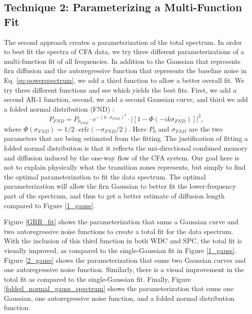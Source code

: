 \documentclass[draft, jgrga]{AGUTeX}
\begin{document}
\begin{article}
\subsection{Technique 2: Parameterizing a Multi-Function Fit}
The second approach creates a parameterization of the total spectrum. In order to best fit the spectra of CFA data, we try three different parameterizations of a multi-function fit of all frequencies. In addition to the Gaussian that represents firn diffusion and the autoregressive function that represents the baseline noise in Eq. \ref{eq:powerspectrum}, we add a third function to allow a better overall fit. We try three different functions and see which yields the best fits. First, we add a second AR-1 function, second, we add a second Gaussian curve, and third we add a folded normal distribution (FND) \citep{Tsagris2014}:
\begin{equation}
P_{FND} = P_{0_{FND}} \cdot e^{-(k \cdot \sigma_{FND})^2} \cdot |\left[1 - \Phi(-i k \sigma_{FND})\right]|^2,
\end{equation}
where $\Phi(\sigma_{FND}) = 1/2\cdot \mathrm{erfc}(-\sigma_{FND}/2) $. Here $P_0$ and $\sigma_{FND}$ are the two parameters that are being estimated from the fitting. The justification of fitting a folded normal distribution is that it reflects the uni-directional combined memory and diffusion induced by the one-way flow of the CFA system. Our goal here is not to explain physically what the transition zones represents, but simply to find the optimal parameterization to fit the data spectrum. The optimal parameterization will allow the firn Gaussian to better fit the lower-frequency part of the spectrum, and thus to get a better estimate of diffusion length compared to Figure \ref{1_gauss}.

Figure \ref{GRR_fit} shows the parameterization that sums a Gaussian curve and two autoregressive noise functions to create a total fit for the data spectrum. With the inclusion of this third function in both WDC and SPC, the total fit is visually improved, as compared to the single-Gaussian fit in Figure \ref{1_gauss}. Figure \ref{2_gauss} shows the parameterization that sums two Gaussian curves and one autoregressive noise function. Similarly, there is a visual improvement in the total fit as compared to the single-Gaussian fit. Finally, Figure \ref{folded_normal_gauss_spectrum} shows the parameterization that sums one Gaussian, one autoregressive noise function, and a folded normal distribution function.



\end{article}
\end{document}
